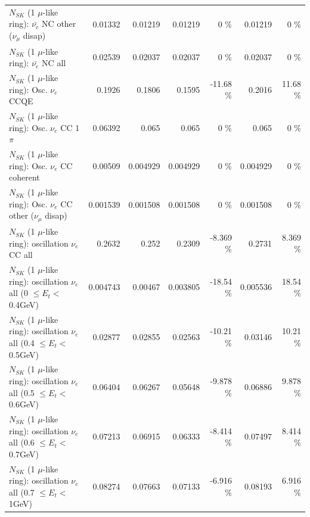\begin{table}
\begin{tabular}{| l | r | r | r  r | r  r |}
          $N_{SK}$ (1 $\mu$-like ring): $\bar{\nu_e}$ NC other ($\nu_\mu$ disap) &         0.01332 &         0.01219 &         0.01219 &        0 \%  &         0.01219 &        0 \%  \\ 
                            $N_{SK}$ (1 $\mu$-like ring): $\bar{\nu_{e}}$ NC all &         0.02539 &         0.02037 &         0.02037 &        0 \%  &         0.02037 &        0 \%  \\ 
\hline
\hline
\hline
                                 $N_{SK}$ (1 $\mu$-like ring): Osc. $\nu_e$ CCQE &          0.1926 &          0.1806 &          0.1595 &   -11.68 \%  &          0.2016 &    11.68 \%  \\ 
                            $N_{SK}$ (1 $\mu$-like ring): Osc. $\nu_e$ CC 1$\pi$ &         0.06392 &           0.065 &           0.065 &        0 \%  &           0.065 &        0 \%  \\ 
                          $N_{SK}$ (1 $\mu$-like ring): Osc. $\nu_e$ CC coherent &         0.00509 &        0.004929 &        0.004929 &        0 \%  &        0.004929 &        0 \%  \\ 
           $N_{SK}$ (1 $\mu$-like ring): Osc. $\nu_e$ CC other ($\nu_\mu$ disap) &        0.001539 &        0.001508 &        0.001508 &        0 \%  &        0.001508 &        0 \%  \\ 
                        $N_{SK}$ (1 $\mu$-like ring): oscillation $\nu_e$ CC all &          0.2632 &           0.252 &          0.2309 &   -8.369 \%  &          0.2731 &    8.369 \%  \\ 
\hline
$N_{SK}$ (1 $\mu$-like ring): oscillation $\nu_{e}$ all (0 $\leq E_{t} <$ 0.4GeV) &        0.004743 &         0.00467 &        0.003805 &   -18.54 \%  &        0.005536 &    18.54 \%  \\ 
$N_{SK}$ (1 $\mu$-like ring): oscillation $\nu_{e}$ all (0.4 $\leq E_{t} <$ 0.5GeV) &         0.02877 &         0.02855 &         0.02563 &   -10.21 \%  &         0.03146 &    10.21 \%  \\ 
$N_{SK}$ (1 $\mu$-like ring): oscillation $\nu_{e}$ all (0.5 $\leq E_{t} <$ 0.6GeV) &         0.06404 &         0.06267 &         0.05648 &   -9.878 \%  &         0.06886 &    9.878 \%  \\ 
$N_{SK}$ (1 $\mu$-like ring): oscillation $\nu_{e}$ all (0.6 $\leq E_{t} <$ 0.7GeV) &         0.07213 &         0.06915 &         0.06333 &   -8.414 \%  &         0.07497 &    8.414 \%  \\ 
$N_{SK}$ (1 $\mu$-like ring): oscillation $\nu_{e}$ all (0.7 $\leq E_{t} <$ 1GeV) &         0.08274 &         0.07663 &         0.07133 &   -6.916 \%  &         0.08193 &    6.916 \%  \\ 

\end{tabular}
\end{table}
